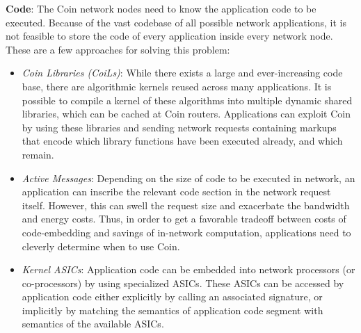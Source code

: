 \documentclass[twocolumn]{article}
\begin{document}
\vspace*{3mm}
\textbf{Code}: The Coin network nodes need to know the application code to be executed.
Because of the vast codebase of all possible network applications, it is not feasible to
store the code of every application inside every network node. These are a few approaches
for solving this problem:
\begin{itemize}
\item \textit{Coin Libraries (CoiLs)}: While there exists a large and ever-increasing code
base, there are algorithmic kernels reused across many applications. It is possible to
compile a kernel of these algorithms into multiple dynamic shared libraries, which can be
cached at Coin routers. Applications can exploit Coin by using these libraries and sending
network requests containing markups that encode which library functions have been executed
already, and which remain.
\item \textit{Active Messages}: Depending on the size of code to be executed in network, an
application can inscribe the relevant code section in the network request itself. However,
this can swell the request size and exacerbate the bandwidth and energy costs. Thus, in order
to get a favorable tradeoff between costs of code-embedding and savings of in-network
computation, applications need to cleverly determine when to use Coin.
\item \textit{Kernel ASICs}: Application code can be embedded into network processors (or
co-processors) by using specialized ASICs. These ASICs can be accessed by application code
either explicitly by calling an associated signature, or implicitly by matching the semantics
of application code segment with semantics of the available ASICs.
\end{itemize}
\end{document}
